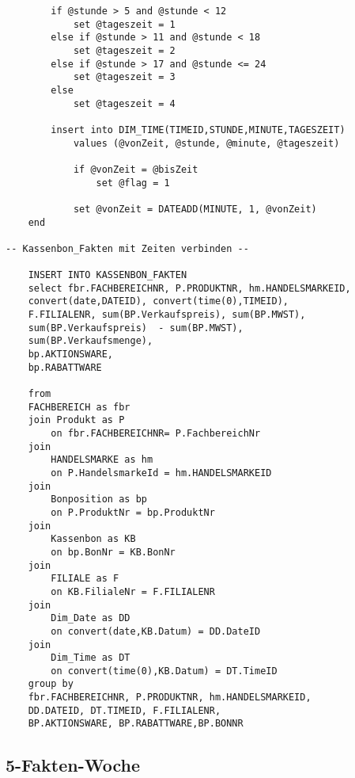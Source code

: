 \begin{lstlisting}
		if @stunde > 5 and @stunde < 12
			set @tageszeit = 1
		else if @stunde > 11 and @stunde < 18
			set @tageszeit = 2
		else if @stunde > 17 and @stunde <= 24
			set @tageszeit = 3
		else
			set @tageszeit = 4

		insert into DIM_TIME(TIMEID,STUNDE,MINUTE,TAGESZEIT)
			values (@vonZeit, @stunde, @minute, @tageszeit)

			if @vonZeit = @bisZeit
				set @flag = 1

			set @vonZeit = DATEADD(MINUTE, 1, @vonZeit)
	end

-- Kassenbon_Fakten mit Zeiten verbinden --

	INSERT INTO KASSENBON_FAKTEN
	select fbr.FACHBEREICHNR, P.PRODUKTNR, hm.HANDELSMARKEID,
	convert(date,DATEID), convert(time(0),TIMEID),
    F.FILIALENR, sum(BP.Verkaufspreis), sum(BP.MWST),
	sum(BP.Verkaufspreis)  - sum(BP.MWST),
	sum(BP.Verkaufsmenge),
	bp.AKTIONSWARE,
	bp.RABATTWARE

	from
	FACHBEREICH as fbr
	join Produkt as P
		on fbr.FACHBEREICHNR= P.FachbereichNr
	join
		HANDELSMARKE as hm
		on P.HandelsmarkeId = hm.HANDELSMARKEID
	join
		Bonposition as bp
		on P.ProduktNr = bp.ProduktNr
	join
		Kassenbon as KB
		on bp.BonNr = KB.BonNr
	join
		FILIALE as F
		on KB.FilialeNr = F.FILIALENR
	join
		Dim_Date as DD
		on convert(date,KB.Datum) = DD.DateID
	join
		Dim_Time as DT
		on convert(time(0),KB.Datum) = DT.TimeID
	group by
	fbr.FACHBEREICHNR, P.PRODUKTNR, hm.HANDELSMARKEID,
	DD.DATEID, DT.TIMEID, F.FILIALENR,
	BP.AKTIONSWARE, BP.RABATTWARE,BP.BONNR

\end{lstlisting}

\subsection{5-Fakten-Woche}

